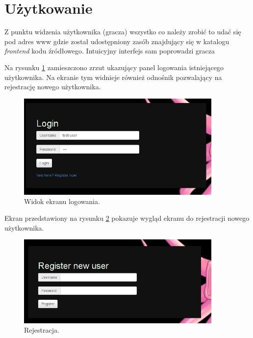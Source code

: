 \section{Użytkowanie}

Z punktu widzenia użytkownika (gracza) wszystko co należy zrobić to udać się pod adres www gdzie został udostępniony zasób znajdujący się w katalogu \emph{frontend} kodu źródłowego. Intuicyjny interfejs sam poprowadzi gracza

Na rysunku \ref{fig:login} zamieszczono zrzut ukazujący panel logowania istniejącego użytkownika. Na ekranie tym widnieje również odnośnik pozwalający na rejestrację nowego użytkownika.
\begin{figure}[ht]
    \centering
    \includegraphics[width=0.9\textwidth]{imgs/login.png}
    \caption{Widok ekranu logowania.}
    \label{fig:login}
\end{figure}

Ekran przedstawiony na rysunku \ref{fig:register} pokazuje wygląd ekranu do rejestracji nowego użytkownika.

\begin{figure}[ht]
    \centering
    \includegraphics[width=0.9\textwidth]{imgs/register.png}
    \caption{Rejestracja.}
    \label{fig:register}
\end{figure}

